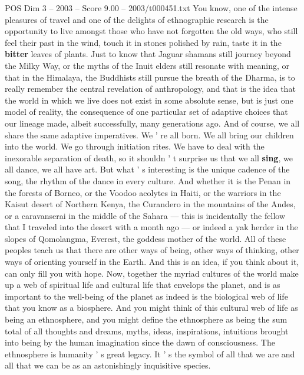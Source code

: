 \begin{textsample}{POS Dim 3 – 2003 – Score 9.00 – 2003/t000451.txt}  \label{ex:f3_pos_073}
You know, one of the intense pleasures of travel and one of the delights of ethnographic research is the opportunity to live amongst those who have not forgotten the old ways, who still feel their past in the wind, touch it in stones polished by rain, taste it in the \textbf{bitter} leaves of plants.
Just to know that Jaguar shamans still journey beyond the Milky Way, or the myths of the Inuit elders still resonate with meaning, or that in the Himalaya, the Buddhists still pursue the breath of the Dharma, is to really remember the central revelation of anthropology, and that is the idea that the world in which we live does not exist in some absolute sense, but is just one model of reality, the consequence of one particular set of adaptive choices that our lineage made, albeit successfully, many generations ago.
And of course, we all share the same adaptive imperatives.
We ' re all born.
We all bring our children into the world.
We go through initiation rites.
We have to deal with the inexorable separation of death, so it shouldn ' t surprise us that we all \textbf{sing}, we all dance, we all have art.
But what ' s interesting is the unique cadence of the song, the rhythm of the dance in every culture.
And whether it is the Penan in the forests of Borneo, or the Voodoo acolytes in Haiti, or the warriors in the Kaisut desert of Northern Kenya, the Curandero in the mountains of the Andes, or a caravanserai in the middle of the Sahara — this is incidentally the fellow that I traveled into the desert with a month ago — or indeed a yak herder in the slopes of Qomolangma, Everest, the goddess mother of the world.
All of these peoples teach us that there are other ways of being, other ways of thinking, other ways of orienting yourself in the Earth.
And this is an idea, if you think about it, can only fill you with hope.
Now, together the myriad cultures of the world make up a web of spiritual life and cultural life that envelops the planet, and is as important to the well-being of the planet as indeed is the biological web of life that you know as a biosphere.
And you might think of this cultural web of life as being an ethnosphere, and you might define the ethnosphere as being the sum total of all thoughts and dreams, myths, ideas, inspirations, intuitions brought into being by the human imagination since the dawn of consciousness.
The ethnosphere is humanity ' s great legacy.
It ' s the symbol of all that we are and all that we can be as an astonishingly inquisitive species.

\end{textsample}
